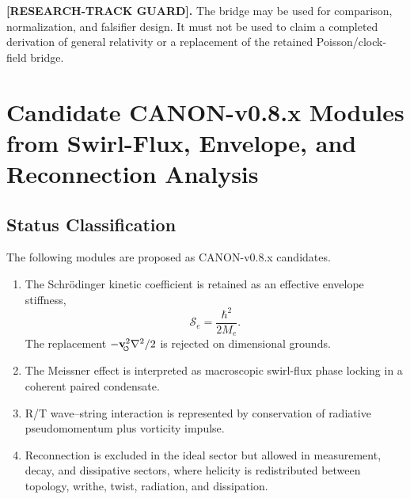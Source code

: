         \textbf{[RESEARCH-TRACK GUARD].}
        The bridge may be used for comparison, normalization, and falsifier
        design.  It must not be used to claim a completed derivation of general
        relativity or a replacement of the retained Poisson/clock-field bridge.



\section{Candidate CANON-v0.8.x Modules from Swirl-Flux, Envelope, and Reconnection Analysis}
    \label{app:sst_v08_candidate_modules}

    \providecommand{\swirlarrow}{%
        \mathchoice{\mkern-2mu\scriptstyle\boldsymbol{\circlearrowleft}}%
        {\mkern-2mu\scriptstyle\boldsymbol{\circlearrowleft}}%
        {\mkern-2mu\scriptscriptstyle\boldsymbol{\circlearrowleft}}%
        {\mkern-2mu\scriptscriptstyle\boldsymbol{\circlearrowleft}}%
    }
    \providecommand{\vswirl}{\mathbf{v}_{\!\swirlarrow}}
\providecommand{\vchar}{v_{\!\boldsymbol{\circlearrowleft}}^{\ast}}
\providecommand{\uswirl}{\mathbf{u}_{\!\boldsymbol{\circlearrowleft}}}
\providecommand{\omegaswirl}{\boldsymbol{\omega}_{\!\boldsymbol{\circlearrowleft}}}
    \providecommand{\rhoF}{\rho_{\!f}}
    \providecommand{\rhoE}{\rho_{\!E}}
    \providecommand{\rhoM}{\rho_{\!m}}
    \providecommand{\rhocore}{\rho_{\mathrm{core}}}
    \providecommand{\rc}{r_c}
    \providecommand{\Fswirlmax}{F_{\mathrm{swirl}}^{\max}}
    
    \subsection{Status Classification}
        
        The following modules are proposed as CANON-v0.8.x candidates.
        
        \begin{enumerate}
            \item The Schrödinger kinetic coefficient is retained as an effective
            envelope stiffness,
            \[
                \mathcal S_e=\frac{\hbar^2}{2M_e}.
            \]
            The replacement \(-\vswirl^2\nabla^2/2\) is rejected on dimensional grounds.
            
            \item The Meissner effect is interpreted as macroscopic swirl-flux phase
            locking in a coherent paired condensate.
            
            \item R/T wave--string interaction is represented by conservation of
            radiative pseudomomentum plus vorticity impulse.
            
            \item Reconnection is excluded in the ideal sector but allowed in
            measurement, decay, and dissipative sectors, where helicity is redistributed
            between topology, writhe, twist, radiation, and dissipation.
        \end{enumerate}
    
